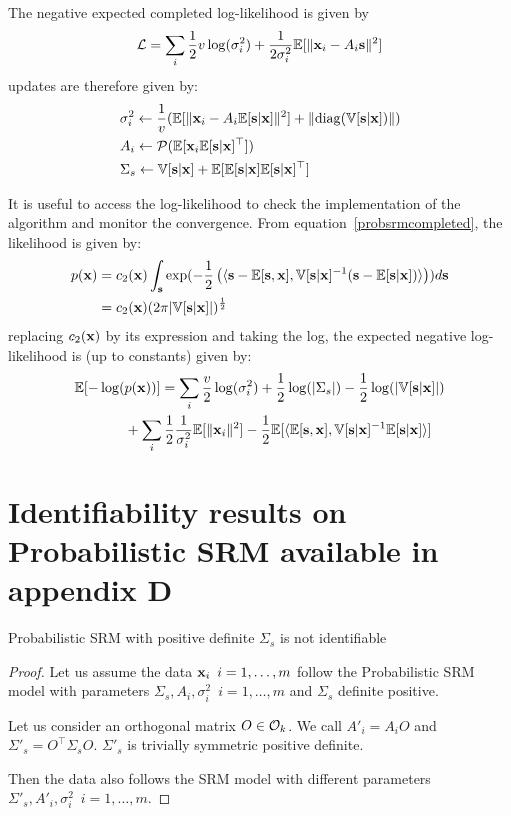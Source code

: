 \documentclass{article}
\begin{document}
The negative expected completed log-likelihood is given by
\begin{align}
	\mathcal{L} = \sum_i \frac12 v \log(\sigma_i^2) + \frac1{2 \sigma_i^2} \mathbb{E}[\| \mathbf{x}_i - A_i \mathbf{s} \|^2]
\end{align}
updates are therefore given by:
\begin{align}
  &\sigma_i^2 \leftarrow \frac1{v} (\mathbb{E}[\| \mathbf{x}_i - A_i \mathbb{E}[\mathbf{s}|\mathbf{x}]\|^2] + \| {\rm diag}(\mathbb{V}[\mathbf{s} | \mathbf{x}]) \|) \\
  &A_i \leftarrow \mathcal{P}(\mathbb{E}[\mathbf{x}_i \mathbb{E}[\mathbf{s}|\mathbf{x}]^{\top}]) \label{eq:psrm:Aiupdate} \\
  & \Sigma_s \leftarrow \mathbb{V}[\mathbf{s} | \mathbf{x}] + \mathbb{E}[\mathbb{E}[\mathbf{s} | \mathbf{x}] \mathbb{E}[\mathbf{s} | \mathbf{x}]^{\top}]
\end{align}

It is useful to access the log-likelihood to check the implementation of the
algorithm and monitor the convergence.
%
From equation~\eqref{probsrmcompleted},
the likelihood is given by:
\begin{align}
  p(\mathbf{x}) &= c_2(\mathbf{x}) \int_{\mathbf{s}} \exp(-\frac12 \left( \langle{  \mathbf{s}- \mathbb{E}[\mathbf{s}},{ \mathbf{x}], \mathbb{V}[\mathbf{s} | \mathbf{x}]^{-1} ( \mathbf{s} - \mathbb{E}[\mathbf{s} | \mathbf{x}])  }\rangle \right)) d\mathbf{s} \\
         &= c_2(\mathbf{x}) (2 \pi |\mathbb{V}[\mathbf{s} | \mathbf{x}]|)^{\frac12}
\end{align}
replacing $c_2(\mathbf{x})$ by its expression and taking the log, the expected negative
log-likelihood is (up to constants) given by:
\begin{align}
  \mathbb{E}[-\log(&p(\mathbf{x}))] = \sum_i \frac{v}{2} \log(\sigma_i^2) + \frac12 \log(|\Sigma_s|) - \frac12 \log(|\mathbb{V}[\mathbf{s} | \mathbf{x}]|) \nonumber \\ &+ \sum_i
  \frac12 \frac1{\sigma_i^2} \mathbb{E}[\|\mathbf{x}_i\|^2] - \frac12 \mathbb{E}[\langle{  \mathbb{E}[\mathbf{s}},{ \mathbf{x}], \mathbb{V}[\mathbf{s} | \mathbf{x}]^{-1} \mathbb{E}[\mathbf{s} | \mathbf{x}] }\rangle]
\end{align}


\section{Identifiability results on Probabilistic SRM available in~\cite{richard2020modeling} appendix D}
\label{app:unidentifiability}
\begin{proposition}
Probabilistic SRM with positive definite $\Sigma_s$ is not identifiable
\end{proposition}
\begin{proof}
Let us assume the data $\mathbf{x}_i \enspace i=1, \dots, m$ follow the Probabilistic SRM model with parameters $\Sigma_s, A_i, \sigma_i^2 \enspace i=1, \dots, m$ and $\Sigma_s$ definite positive.

Let us consider an orthogonal matrix $O \in \mathcal{O}_k$.
We call $A'_i = A_i O$ and $\Sigma'_s = O^{\top} \Sigma_s O$.
$\Sigma'_s$ is trivially symmetric positive definite.

Then the data also follows the SRM model with different parameters $\Sigma'_s, A'_i, \sigma_i^2 \enspace i=1, \dots, m$.
\end{proof}
\end{document}

